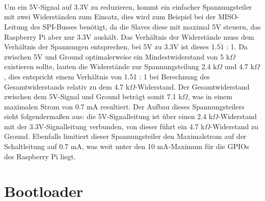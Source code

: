 \documentclass[12pt]{article}
\begin{document}
\\\\\\\\\\\\\\\\Um ein 5V-Signal auf 3.3V zu reduzieren, kommt ein einfacher Spannungsteiler mit zwei Widerständen zum Einsatz, dies wird zum Beispiel bei der MISO-Leitung des SPI-Busses benötigt, da die Slaves diese mit maximal 5V steuern, das Raspberry Pi aber nur 3.3V aushält. Das Verhältnis der Widerstände muss dem Verhältnis der Spannungen entsprechen, bei 5V zu 3.3V ist dieses 1.$\overline{51}$ : 1. Da zwischen 5V und Ground optimalerweise ein Mindestwiderstand von 5 k$\Omega$ existieren sollte, lauten die Widerstände zur Spannungsteilung 2.4 k$\Omega$ und 4.7 k$\Omega$, dies entspricht einem Verhältnis von 1.51 : 1 bei Berechnung des Gesamtwiderstands relativ zu dem 4.7 k$\Omega$-Widerstand. Der Gesamtwiderstand zwischen dem 5V-Signal und Ground beträgt somit 7.1 k$\Omega$, was in einem maximalen Strom von 0.7 mA resultiert. Der Aufbau dieses Spannungsteilers sieht folgendermaßen aus: die 5V-Signalleitung ist über einen 2.4 k$\Omega$-Widerstand mit der 3.3V-Signalleitung verbunden, von dieser führt ein 4.7 k$\Omega$-Widerstand zu Ground. Ebenfalls limitiert dieser Spannungsteiler den Maximalstrom auf der Schaltleitung auf 0.7 mA, was weit unter den 10 mA-Maximum für die GPIOs des Raspberry Pi liegt.
\newpage\section{Bootloader}
\end{document}
